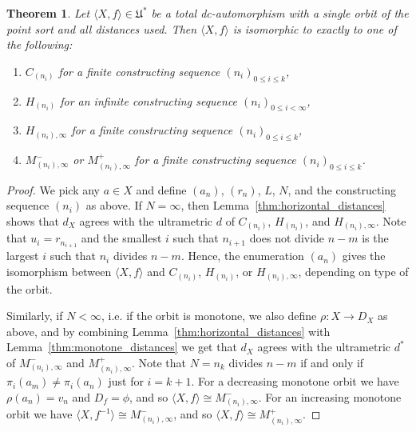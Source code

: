 \documentclass[10pt,a4paper]{article}
\newtheorem{tw}{Theorem}[section]
\theoremstyle{definition}
\theoremstyle{remark}
\newcommand \seq [1]{\langle #1 \rangle}
\newcommand \maps {\colon} %
\newcommand \Ult {\mathfrak{U}}
\begin{document}
\begin{tw} \label{thm:single_orbit}
    Let $\seq{X, f} \in \Ult^*$ be a total dc-automorphism with a single orbit of the point sort and all distances used.
    Then $\seq{X, f}$ is isomorphic to exactly to one of the following:
    \begin{enumerate}
        \item $C_{(n_i)} $ for a finite constructing sequence $(n_i)_{0 \leq i \leq k}$,
        \item $H_{(n_i)} $ for an infinite constructing sequence $(n_i)_{0 \leq i < \infty}$,
        \item $H_{(n_i), \infty} $ for a finite constructing sequence $(n_i)_{0 \leq i \leq k}$,
        \item $M^-_{(n_i),\infty} $ or $M^+_{(n_i),\infty}$ for a finite constructing sequence $(n_i)_{0 \leq i \leq k}$.
    \end{enumerate}
\end{tw}
\begin{proof}
    We pick any $a \in X$ and define $(a_n)$, $(r_n)$, $L$, $N$, and the constructing sequence $(n_i)$ as above.
    If $N = \infty$, then Lemma~\ref{thm:horizontal_distances} shows that $d_X$ agrees with the ultrametric $d$ of $C_{(n_i)}$, $H_{(n_i)}$, and $H_{(n_i), \infty}$.
    Note that $u_i = r_{n_{i + 1}}$ and the smallest $i$ such that $n_{i + 1}$ does not divide $n - m$ is the largest $i$ such that $n_i$ divides $n - m$.
    Hence, the enumeration $(a_n)$ gives the isomorphism between $\seq{X, f}$ and $C_{(n_i)}$, $H_{(n_i)}$, or $H_{(n_i), \infty}$, depending on type of the orbit.

    Similarly, if $N < \infty$, i.e. if the orbit is monotone, we also define $\rho\maps X \to D_X$ as above, and by combining Lemma~\ref{thm:horizontal_distances} with Lemma~\ref{thm:monotone_distances} we get that $d_X$ agrees with the ultrametric $d^*$ of $M^-_{(n_i), \infty}$ and $M^+_{(n_i), \infty}$.
    Note that $N = n_k$ divides $n - m$ if and only if $\pi_i(a_m) \neq \pi_i(a_n)$ just for $i = k + 1$.
    For a decreasing monotone orbit we have $\rho(a_n) = v_n$ and $D_f = \phi$, and so $\seq{X, f} \cong M^-_{(n_i), \infty}$.
    For an increasing monotone orbit we have $\seq{X, f^{-1}} \cong M^-_{(n_i), \infty}$, and so $\seq{X, f} \cong M^+_{(n_i), \infty}$.
\end{proof}
\end{document}
